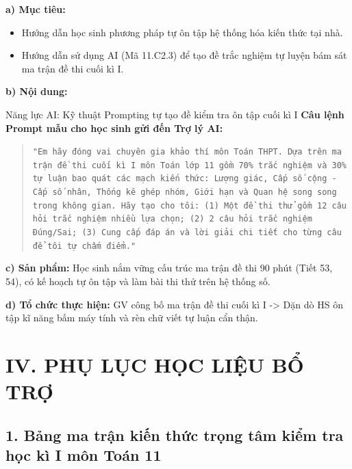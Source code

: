 \documentclass[12pt, a4paper]{article}
\begin{document}
\noindent \textbf{a) Mục tiêu:}
\begin{itemize}
    \item Hướng dẫn học sinh phương pháp tự ôn tập hệ thống hóa kiến thức tại nhà.
    \item Hướng dẫn sử dụng AI (Mã 11.C2.3) để tạo đề trắc nghiệm tự luyện bám sát ma trận đề thi cuối kì I.
\end{itemize}

\noindent \textbf{b) Nội dung:}
\begin{aibox}{Năng lực AI: Kỹ thuật Prompting tự tạo đề kiểm tra ôn tập cuối kì I}
    \textbf{Câu lệnh Prompt mẫu cho học sinh gửi đến Trợ lý AI:}
    \begin{quote}
        \small \texttt{"Em hãy đóng vai chuyên gia khảo thí môn Toán THPT. Dựa trên ma trận đề thi cuối kì I môn Toán lớp 11 gồm 70\% trắc nghiệm và 30\% tự luận bao quát các mạch kiến thức: Lượng giác, Cấp số cộng - Cấp số nhân, Thống kê ghép nhóm, Giới hạn và Quan hệ song song trong không gian. Hãy tạo cho tôi: (1) Một đề thi thử gồm 12 câu hỏi trắc nghiệm nhiều lựa chọn; (2) 2 câu hỏi trắc nghiệm Đúng/Sai; (3) Cung cấp đáp án và lời giải chi tiết cho từng câu để tôi tự chấm điểm."}
    \end{quote}
\end{aibox}

\noindent \textbf{c) Sản phẩm:}
Học sinh nắm vững cấu trúc ma trận đề thi 90 phút (Tiết 53, 54), có kế hoạch tự ôn tập và làm bài thi thử trên hệ thống số.

\noindent \textbf{d) Tổ chức thực hiện:}
GV công bố ma trận đề thi cuối kì I -> Dặn dò HS ôn tập kĩ năng bấm máy tính và rèn chữ viết tự luận cẩn thận.

\vspace{5pt}

\section*{IV. PHỤ LỤC HỌC LIỆU BỔ TRỢ}

\subsection*{1. Bảng ma trận kiến thức trọng tâm kiểm tra học kì I môn Toán 11}
\end{document}
